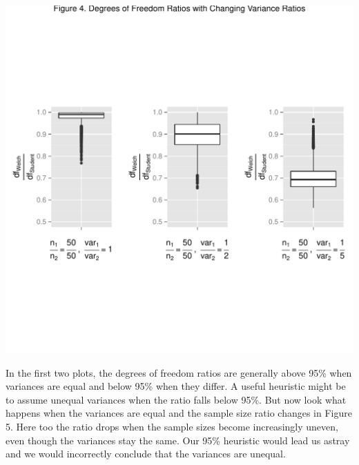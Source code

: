 \documentclass[man,a4paper,noextraspace]{apa6}\usepackage[]{graphicx}\usepackage[]{color}
\makeatletter
\def\maxwidth{ %
  \ifdim\Gin@nat@width>\linewidth
    \linewidth
  \else
    \Gin@nat@width
  \fi
}
\newenvironment{knitrout}{}{} %
\makeatother
\begin{document}
\begin{knitrout}
\color{fgcolor}
\includegraphics[width=\maxwidth]{figure/dfratiosDiffvars} 

\end{knitrout}

    In the first two plots, the degrees of freedom ratios are generally above 95\% when variances are equal and below 95\% when they differ. A useful heuristic might be to assume unequal variances when the ratio falls below 95\%. But now look what happens when the variances are equal and the sample size ratio changes in Figure 5. Here too the ratio drops when the sample sizes become increasingly uneven, even though the variances stay the same. Our 95\% heuristic would lead us astray and we would incorrectly conclude that the variances are unequal.
\end{document}
